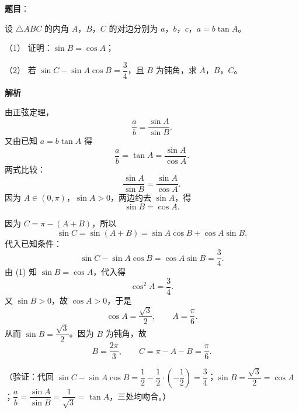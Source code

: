 \begin{answer}

\textbf{题目}：

设 \(\triangle ABC\) 的内角 \(A\)，\(B\)，\(C\) 的对边分别为 \(a\)，\(b\)，\(c\)，\(a=b\tan A\)。

（1） 证明：\(\sin B=\cos A\)；

（2） 若 \(\sin C-\sin A\cos B=\dfrac34\)，且 \(B\) 为钝角，求 \(A\)，\(B\)，\(C\)。

\textbf{解析}


由正弦定理，
\nopagebreak[4]
\[
\dfrac ab=\dfrac{\sin A}{\sin B}.
\]
又由已知 \(a=b\tan A\) 得
\nopagebreak[4]
\[
\dfrac ab=\tan A=\dfrac{\sin A}{\cos A}.
\]
两式比较：
\nopagebreak[4]
\[
\dfrac{\sin A}{\sin B}=\dfrac{\sin A}{\cos A}.
\]
因为 \(A\in(0,\pi)\)，\(\sin A>0\)，两边约去 \(\sin A\)，得
\nopagebreak[4]
\[
\sin B=\cos A.
\]


因为 \(C=\pi-(A+B)\)，所以
\nopagebreak[4]
\[
\sin C=\sin(A+B)=\sin A\cos B+\cos A\sin B.
\]
代入已知条件：
\nopagebreak[4]
\[
\sin C-\sin A\cos B=\cos A\sin B=\dfrac34.
\]
由 (1) 知 \(\sin B=\cos A\)，代入得
\nopagebreak[4]
\[
\cos^2A=\dfrac34.
\]
又 \(\sin B>0\)，故 \(\cos A>0\)，于是
\nopagebreak[4]
\[
\cos A=\dfrac{\sqrt3}{2},\qquad A=\dfrac{\pi}{6}.
\]
从而 \(\sin B=\dfrac{\sqrt3}{2}\)。因为 \(B\) 为钝角，故
\nopagebreak[4]
\[
B=\dfrac{2\pi}{3},\qquad C=\pi-A-B=\dfrac{\pi}{6}.
\]

（验证：代回 \(\sin C-\sin A\cos B=\dfrac12-\dfrac12\cdot\left(-\dfrac12\right)=\dfrac34\)；\(\sin B=\dfrac{\sqrt3}{2}=\cos A\)；\(\dfrac ab=\dfrac{\sin A}{\sin B}=\dfrac{1}{\sqrt3}=\tan A\)，三处均吻合。）



\end{answer}
